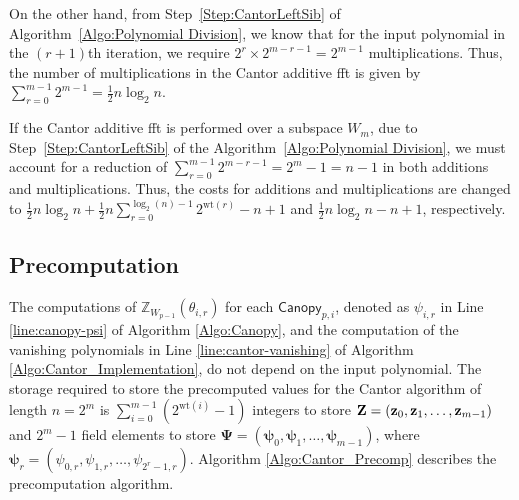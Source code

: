 On the other hand, from Step~\ref{Step:CantorLeftSib} of Algorithm~\ref{Algo:Polynomial Division}, we know that for the input polynomial in the $(r+1)$th iteration, we require $2^r \times 2^{m-r-1}= 2^{m-1}$ multiplications. Thus, the number of multiplications in the Cantor additive \gls{fft} is given by
\(\sum_{r=0}^{m-1} 2^{m-1} = \frac{1}{2} n \log_2 n .\)

If the Cantor additive \gls{fft} is performed over a subspace $W_m$, due to Step~\ref{Step:CantorLeftSib} of the Algorithm~\ref{Algo:Polynomial Division}, we must account for a reduction of $\sum_{r=0}^{m-1} 2^{m-r-1}=2^m-1=n-1$ in both additions and multiplications. Thus, the costs for additions and multiplications are changed to
$\frac{1}{2} n\log_2 n + \frac{1}{2}n \sum_{r=0}^{\log_2(n)-1} 2^{\text{wt}(r)} -n +1$ and $\frac{1}{2} n \log_2 n-n+1$, respectively.

\subsection{Precomputation} \label{sec:cantor_precmp}


The computations of $\mathbb{Z}_{W_{p-1}}(\theta_{i, r})$ for each \(\mathsf{Canopy}_{p, i}\), denoted as $\psi_{i, r}$ in Line \ref{line:canopy-psi} of Algorithm \ref{Algo:Canopy}, and the computation of the vanishing polynomials in Line \ref{line:cantor-vanishing} of Algorithm \ref{Algo:Cantor_Implementation}, do not depend on the input polynomial. 
The storage required to store the precomputed values for the Cantor algorithm of length $n = 2^m$ is 
$
\sum_{i=0}^{m-1} \left(2^{\text{wt}(i)} - 1\right)
$
integers to store $\mathbf{Z} = ({\bf{z}}_0, {\bf{z}}_1, \ldots, {\bf{z}}_{m-1})$ and $2^m - 1$ field elements to store $\boldsymbol{\Psi} = (\boldsymbol{\psi}_0, \boldsymbol{\psi}_1, \ldots, \boldsymbol{\psi}_{m-1})$, where $\boldsymbol{\psi}_r = ( \psi_{0,r}, \psi_{1,r}, \ldots, \psi_{2^r-1,r} )$. Algorithm \ref{Algo:Cantor_Precomp}  describes the precomputation algorithm. 

